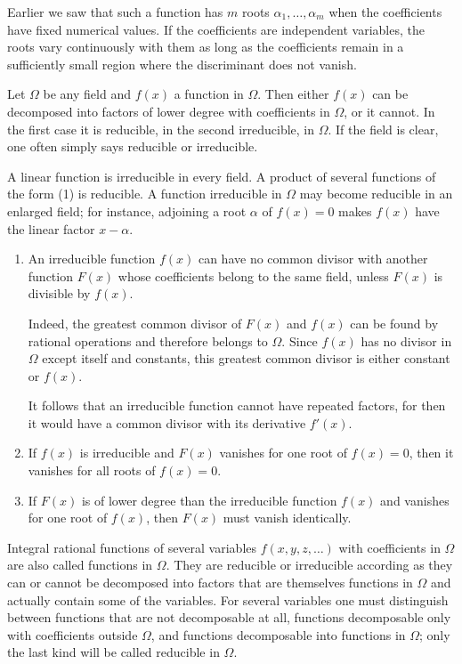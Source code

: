 \documentclass[11pt]{article}
\begin{document}
Earlier we saw that such a function has $m$ roots $\alpha_1,\ldots,\alpha_m$ when the coefficients have fixed numerical values. If the coefficients are independent variables, the roots vary continuously with them as long as the coefficients remain in a sufficiently small region where the discriminant does not vanish.

Let $\Omega$ be any field and $f(x)$ a function in $\Omega$. Then either $f(x)$ can be decomposed into factors of lower degree with coefficients in $\Omega$, or it cannot. In the first case it is reducible, in the second irreducible, in $\Omega$. If the field is clear, one often simply says reducible or irreducible.

A linear function is irreducible in every field. A product of several functions of the form (1) is reducible. A function irreducible in $\Omega$ may become reducible in an enlarged field; for instance, adjoining a root $\alpha$ of $f(x)=0$ makes $f(x)$ have the linear factor $x-\alpha$.

\begin{enumerate}[label=\Roman*.,leftmargin=2.8em]
\item An irreducible function $f(x)$ can have no common divisor with another function $F(x)$ whose coefficients belong to the same field, unless $F(x)$ is divisible by $f(x)$.

Indeed, the greatest common divisor of $F(x)$ and $f(x)$ can be found by rational operations and therefore belongs to $\Omega$. Since $f(x)$ has no divisor in $\Omega$ except itself and constants, this greatest common divisor is either constant or $f(x)$.

It follows that an irreducible function cannot have repeated factors, for then it would have a common divisor with its derivative $f'(x)$.

\item If $f(x)$ is irreducible and $F(x)$ vanishes for one root of $f(x)=0$, then it vanishes for all roots of $f(x)=0$.

\item If $F(x)$ is of lower degree than the irreducible function $f(x)$ and vanishes for one root of $f(x)$, then $F(x)$ must vanish identically.
\end{enumerate}

Integral rational functions of several variables $f(x,y,z,\ldots)$ with coefficients in $\Omega$ are also called functions in $\Omega$. They are reducible or irreducible according as they can or cannot be decomposed into factors that are themselves functions in $\Omega$ and actually contain some of the variables. For several variables one must distinguish between functions that are not decomposable at all, functions decomposable only with coefficients outside $\Omega$, and functions decomposable into functions in $\Omega$; only the last kind will be called reducible in $\Omega$.
\end{document}
